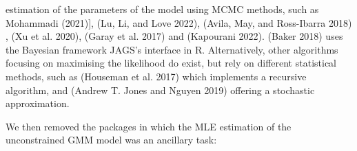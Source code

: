 \begin{itemize}
  estimation of the parameters of the model using MCMC methods, such
  as  Mohammadi (2021){]},  (Lu, Li, and Love 2022),  (Avila, May, and Ross-Ibarra 2018)
  ,  (Xu et al. 2020),  (Garay et al. 2017) and
   (Kapourani 2022).  (Baker 2018) uses the Bayesian
  framework JAGS's interface in R. Alternatively, other algorithms
  focusing on maximising the likelihood do exist, but rely on
  different statistical methods, such as  (Houseman et al. 2017)
  which implements a recursive algorithm, and 
  (Andrew T. Jones and Nguyen 2019) offering a stochastic approximation.
\end{itemize}

We then removed the packages in which the MLE estimation of the
unconstrained GMM model was an ancillary task:

